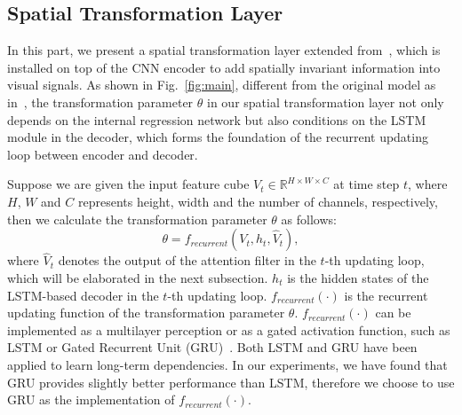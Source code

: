 \documentclass[10pt,twocolumn,letterpaper]{article}
\begin{document}
	\subsection{Spatial Transformation Layer}\label{sec:spatial invariance}
	In this part, we present a spatial transformation layer extended from~\cite{}, which is installed on top of the CNN encoder to add spatially invariant information into visual signals. As shown in Fig.~\ref{fig:main}, different from the original model as in~\cite{}, the transformation parameter $\theta$ in our spatial transformation layer not only depends on the internal regression network but also conditions on the LSTM module in the decoder, which forms the foundation of the recurrent updating loop between encoder and decoder.
	
	
	
	Suppose we are given the input feature cube $V_{t}\in {\mathbb{R}^{H \times W \times C}}$ at time step $t$, where $H$, $W$ and $C$ represents height, width and the number of channels, respectively, then we calculate the transformation parameter $\theta$ as follows:
	\begin{equation}\label{eq:theta}
	\theta=f_{recurrent}(V_{t},h_{t},\hat{V}_{t}),
	\end{equation}
	where $\hat{V}_{t}$ denotes the output of the attention filter in the $t$-th updating loop, which will be elaborated in the next subsection. $h_{t}$ is the hidden states of the LSTM-based decoder in the $t$-th updating loop. $f_{recurrent}(\cdot)$ is the recurrent updating function of the transformation parameter $\theta$. $f_{recurrent}(\cdot)$ can be implemented as a multilayer perception or as a gated activation function, such as LSTM or Gated Recurrent Unit (GRU)~\cite{cho2014learning}. Both LSTM and GRU have been applied to learn long-term dependencies. In our experiments, we have found that GRU provides slightly better performance than LSTM, therefore we choose to use GRU as the implementation of $f_{recurrent}(\cdot)$.
	
\end{document}
